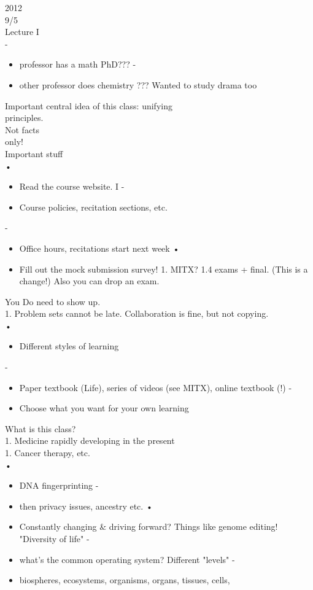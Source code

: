 2012
\\9/5
\\Lecture I
\\-\begin{itemize}\item  professor has a math PhD???
-\item  other professor does chemistry ??? Wanted to study drama too
\end{itemize}
Important central idea of this class: unifying
\\principles.
\\Not facts
\\only!
\\Important stuff
\\•\begin{itemize}\item  Read the course website.
I -\item  Course policies, recitation sections, etc.
\end{itemize}
-\begin{itemize}\item  Office hours, recitations start next week
•\item  Fill out the mock submission survey!
1. MITX?
1.4 exams + final. (This is a change!) Also you can drop an exam.
\end{itemize}
You Do need to show up.
\\1. Problem sets cannot be late. Collaboration is fine, but not copying.
\\•\begin{itemize}\item  Different styles of learning
\end{itemize}
-\begin{itemize}\item  Paper textbook (Life), series of videos (see MITX), online textbook (!)
-\item  Choose what you want for your own learning
\end{itemize}
What is this class?
\\1. Medicine rapidly developing in the present
\\1. Cancer therapy, etc.
\\•\begin{itemize}\item  DNA fingerprinting -\item  then privacy issues, ancestry etc.
•\item  Constantly changing \& driving forward? Things like genome editing!
"Diversity of life" -\item  what's the common operating system?
Different "levels" -\item  biospheres, ecosystems, organisms, organs, tissues, cells,
\end{itemize}
